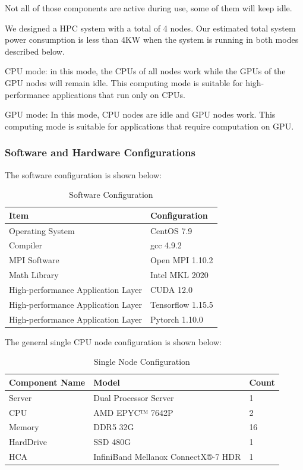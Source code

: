 \documentclass[a4paper,12pt]{article}
\begin{document}
Not all of those components are active during use, some of them will keep idle.

We designed a HPC system with a total of 4 nodes. Our estimated total system power consumption is less than 4KW when the system is running in both modes described below.

CPU mode: in this mode, the CPUs of all nodes work while the GPUs of the GPU nodes will remain idle. This computing mode is suitable for high-performance applications that run only on CPUs.

GPU mode: In this mode, CPU nodes are idle and GPU nodes work. This computing mode is suitable for applications that require computation on GPU.

\subsubsection{Software and Hardware Configurations}
The software configuration is shown below:
\begin{table}[H]
	\centering
	\caption{Software Configuration}
	\vspace{0.5cm}
	\begin{tabular}{ll}
		\toprule
		Item & Configuration \\
		\midrule
		Operating System & CentOS 7.9 \\
		Compiler & gcc 4.9.2 \\
		MPI Software & Open MPI 1.10.2 \\
		Math Library & Intel MKL 2020 \\
		High-performance Application Layer & CUDA 12.0 \\
		High-performance Application Layer & Tensorflow 1.15.5 \\
		High-performance Application Layer & Pytorch 1.10.0 \\
		\bottomrule
	\end{tabular}
\end{table}

The general single CPU node configuration is shown below:
\begin{table}[H]
\centering
\caption{Single Node Configuration}
\vspace{0.5cm}
\begin{tabular}{lll}
\toprule
Component Name & Model & Count \\
\midrule
Server & Dual Processor Server & 1 \\
CPU & AMD EPYC™ 7642P & 2 \\
Memory & DDR5 32G & 16 \\
HardDrive & SSD 480G & 1 \\
HCA & InfiniBand Mellanox ConnectX®-7 HDR & 1 \\
\bottomrule
\end{tabular}
\end{table}
\end{document}
